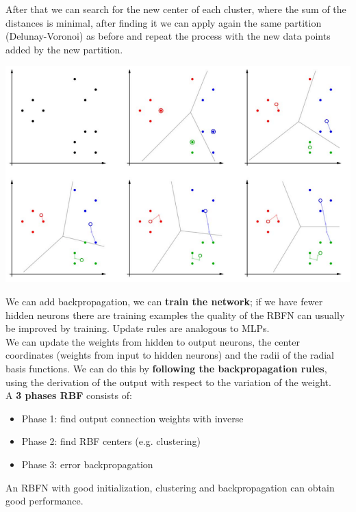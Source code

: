 \documentclass[11pt]{article}
\begin{document}
		\newpage
		
		After that we can search for the new center of each cluster, where the sum of the distances is minimal, after finding it we can apply again the same partition (Delunay-Voronoi) as before and repeat the process with the new data points added by the new partition.
		\begin{center}
			\includegraphics[width=0.9\columnwidth]{img/NN/clustering3}
		\end{center}
		
		We can add backpropagation, we can \textbf{train the network}; if we have fewer hidden neurons there are training examples the quality of the RBFN can usually be improved by training. Update rules are analogous to MLPs.\\
		
		We can update the weights from hidden to output neurons, the center coordinates (weights from input to hidden neurons) and the radii of the radial basis functions. We can do this by \textbf{following the backpropagation rules}, using the derivation of the output with respect to the variation of the weight.\\
		
		A \textbf{3 phases RBF} consists of:
		\begin{itemize}
			\item Phase 1: find output connection weights with inverse
			\item Phase 2: find RBF centers (e.g. clustering)
			\item Phase 3: error backpropagation
		\end{itemize}
		An RBFN with good initialization, clustering and backpropagation can obtain good performance.\\
		
		
\end{document}
